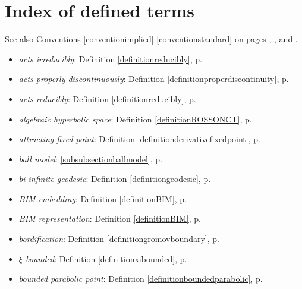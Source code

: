 \chapter{Index of defined terms}
\label{appendixindex}

See also Conventions \ref{conventionimplied}-\ref{conventionstandard} on pages \pageref{conventionimplied}, \pageref{conventionH}, and \pageref{conventiontriples}.

\begin{itemize}
\item\emph{acts irreducibly}: Definition \ref{definitionreducibly}, p.\pageref{definitionreducibly}
\item\emph{acts properly discontinuously}: Definition \ref{definitionproperdiscontinuity}, p.\pageref{definitionproperdiscontinuity}
\item\emph{acts reducibly}: Definition \ref{definitionreducibly}, p.\pageref{definitionreducibly}
\item\emph{algebraic hyperbolic space}: Definition \ref{definitionROSSONCT}, p.\pageref{definitionROSSONCT}
\item\emph{attracting fixed point}: Definition \ref{definitionderivativefixedpoint}, p.\pageref{definitionderivativefixedpoint}
\item\emph{ball model}: \6\ref{subsubsectionballmodel}, p.\pageref{subsubsectionballmodel}
\item\emph{bi-infinite geodesic}: Definition \ref{definitiongeodesic}, p.\pageref{definitiongeodesic}
\item\emph{BIM embedding}: Definition \ref{definitionBIM}, p.\pageref{definitionBIM}
\item\emph{BIM representation}: Definition \ref{definitionBIM}, p.\pageref{definitionBIM}
\item\emph{bordification}: Definition \ref{definitiongromovboundary}, p.\pageref{definitiongromovboundary}
\item\emph{$\xi$-bounded}: Definition \ref{definitionxibounded}, p.\pageref{definitionxibounded}
\item\emph{bounded parabolic point}: Definition \ref{definitionboundedparabolic}, p.\pageref{definitionboundedparabolic}

\end{itemize}
